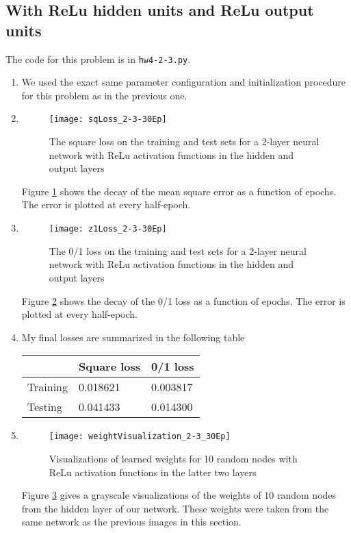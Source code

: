 \documentclass{article}
\begin{document}

\subsection{With ReLu hidden units and ReLu output units}
The code for this problem is in \texttt{hw4-2-3.py}.

    \begin{enumerate}
    \item We used the exact same parameter configuration and initialization procedure for this problem as in the previous one.
    \item
    \begin{figure}
        \centering
        \texttt{[image: sqLoss\_2-3-30Ep]}
        \caption{The square loss on the training and test sets for a 2-layer neural network with ReLu activation functions in the hidden and output layers} 
        \label{fig:sqLoss_2-3}
    \end{figure}
    Figure \ref{fig:sqLoss_2-3} shows the decay of the mean square error as a function of epochs. The error is plotted at every half-epoch.
    \item
    \begin{figure}
        \centering
        \texttt{[image: z1Loss\_2-3-30Ep]}
        \caption{The 0/1 loss on the training and test sets for a 2-layer neural network with ReLu activation functions in the hidden and output layers} 
        \label{fig:z1Loss_2-3}
    \end{figure}
    Figure \ref{fig:z1Loss_2-3} shows the decay of the 0/1 loss as a function of epochs. The error is plotted at every half-epoch.
    \item My final losses are summarized in the following table

    \begin{tabular}{l|ll}
    & Square loss & 0/1 loss \\
    \hline
    Training & 0.018621  & 0.003817 \\
    Testing  & 0.041433  & 0.014300
    \end{tabular}

    \item 
    \begin{figure}
        \centering
        \texttt{[image: weightVisualization\_2-3\_30Ep]}
        \caption{Visualizations of learned weights for 10 random nodes with ReLu activation functions in the latter two layers} 
        \label{fig:weights2-3}
    \end{figure}
    Figure \ref{fig:weights2-3} gives a grayscale visualizations of the weights of 10 random nodes from the hidden layer of our network. These weights were taken from the same network as the previous images in this section.
\end{enumerate}
\end{document}
